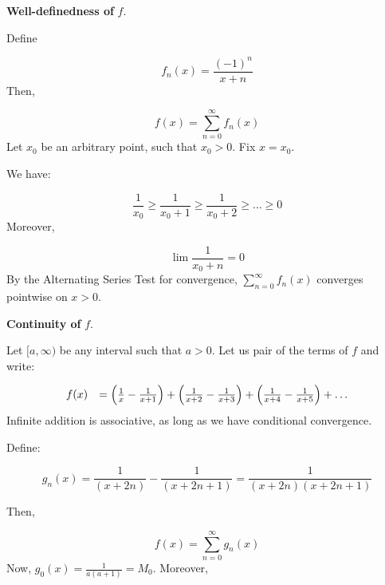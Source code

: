 \documentclass[10pt]{article}
\begin{document}
\textbf{Well-definedness of }$\displaystyle f$.



Define


\begin{equation*}
f_{n}( x) =\frac{( -1)^{n}}{x+n}
\end{equation*}
Then,


\begin{equation*}
f( x) =\sum _{n=0}^{\infty } f_{n}( x)
\end{equation*}
Let $\displaystyle x_{0}$ be an arbitrary point, such that $\displaystyle x_{0}  >0$. Fix $\displaystyle x=x_{0}$.



We have:


\begin{equation*}
\frac{1}{x_{0}} \geq \frac{1}{x_{0} +1} \geq \frac{1}{x_{0} +2} \geq \dotsc \geq 0
\end{equation*}
Moreover, 


\begin{equation*}
\lim \frac{1}{x_{0} +n} =0
\end{equation*}
By the Alternating Series Test for convergence, $\displaystyle \sum _{n=0}^{\infty } f_{n}( x)$ converges pointwise on $\displaystyle x >0$. 

\textbf{Continuity of }$\displaystyle f$.



Let $\displaystyle [ a,\infty )$ be any interval such that $\displaystyle a >0$. Let us pair of the terms of $\displaystyle f$ and write:


\begin{equation*}
\begin{array}{ c l }
f( x) & =\left(\frac{1}{x} -\frac{1}{x+1}\right) +\left(\frac{1}{x+2} -\frac{1}{x+3}\right) +\left(\frac{1}{x+4} -\frac{1}{x+5}\right) +\dotsc 
\end{array}
\end{equation*}
Infinite addition is associative, as long as we have conditional convergence. 

Define:


\begin{equation*}
g_{n}( x) =\frac{1}{( x+2n)} -\frac{1}{( x+2n+1)} =\frac{1}{( x+2n)( x+2n+1)}
\end{equation*}


Then,


\begin{equation*}
f( x) =\sum _{n=0}^{\infty } g_{n}( x)
\end{equation*}
Now, $\displaystyle g_{0}( x) =\frac{1}{a( a+1)} =M_{0}$. Moreover, 
\end{document}
